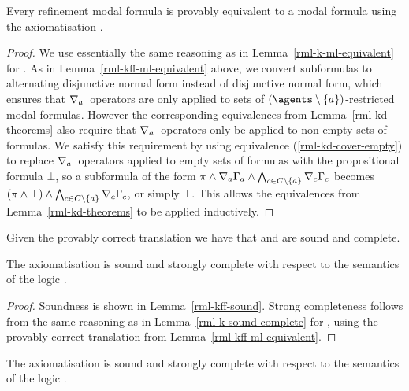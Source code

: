 \begin{lemma}\label{rml-kd-ml-equivalent}
Every refinement modal formula is provably equivalent to a modal formula using the axiomatisation \axiomRmlKFF{}.
\end{lemma}

\begin{proof}
We use essentially the same reasoning as in Lemma~\ref{rml-k-ml-equivalent} for \axiomRmlK{}.
As in Lemma~\ref{rml-kff-ml-equivalent} above, we convert subformulas to alternating disjunctive normal form instead of disjunctive normal form, which ensures that $\nabla_{a}$~operators are only applied to sets of $(\agents \setminus \{\agentA\})$-restricted modal formulas.
However the corresponding equivalences from Lemma~\ref{rml-kd-theorems} also require that $\nabla_{a}$~operators only be applied to non-empty sets of formulas.
We satisfy this requirement by using equivalence (\ref{rml-kd-cover-empty}) to replace $\nabla_{a}$~operators applied to empty sets of formulas with the propositional formula $\bot$, so a subformula of the form $\pi \land \nabla_{a} \Gamma_a \land \bigwedge_{c \in C \setminus \{a\}} \nabla_{c} \Gamma_c$ becomes $(\pi \land \bot) \land \bigwedge_{c \in C \setminus \{a\}} \nabla_{c} \Gamma_c$, or simply $\bot$.
This allows the equivalences from Lemma~\ref{rml-kd-theorems} to be applied inductively.
\end{proof}

Given the provably correct translation we have that \axiomRmlKFF{} and \axiomRmlKD{} are sound and complete.

\begin{theorem}\label{rml-kff-sound-complete}
The axiomatisation \axiomRmlKFF{} is sound and strongly complete with respect to the semantics of the logic \logicRmlKFF{}.
\end{theorem}

\begin{proof}
Soundness is shown in Lemma~\ref{rml-kff-sound}.
Strong completeness follows from the same reasoning as in Lemma~\ref{rml-k-sound-complete} for \axiomRmlK{}, using the provably correct translation from Lemma~\ref{rml-kff-ml-equivalent}.
\end{proof}

\begin{theorem}\label{rml-kd-sound-complete}
The axiomatisation \axiomRmlKFF{} is sound and strongly complete with respect to the semantics of the logic \logicRmlKD{}.
\end{theorem}

